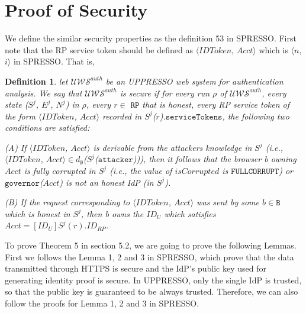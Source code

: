 \documentclass[letterpaper,onecolumn,10pt]{article}
\newtheorem{definition}{Definition}
\begin{document}
\section{Proof of Security}

We define  the similar security properties as the definition 53 in SPRESSO. 
First note that the RP service token should be defined as $\langle IDToken$, $Acct \rangle$ which is $\langle n$, $i \rangle$ in SPRESSO.
That is,  
\begin{definition}
let  $\mathcal{U\!W\!S}^{auth}$ be an UPPRESSO web system for authentication analysis. We say that $\mathcal{U\!W\!S}^{auth}$ is secure if for every run $\rho$ of $\mathcal{U\!W\!S}^{auth}$, every state ($S^j$, $E^j$, $N^j$) in $\rho$, every $r \in$ $\mathtt{RP}$ that is honest, every RP service token of the form $\langle IDToken$, $Acct \rangle$ recorded in $S^j$($r$).$\mathtt{serviceTokens}$, the following two conditions are satisfied:

(A) If $\langle IDToken$, $Acct \rangle$ is derivable from the attackers knowledge in $S^j$ (i.e., $\langle IDToken$, $Acct \rangle \in d_{\emptyset}$($S^j$($\mathtt{attacker}$))), then it follows that the browser b owning $Acct$ is fully corrupted in $S^j$ (i.e., the value of $isCorrupted$ is $\mathtt{FULLCORRUPT}$) or $\mathtt{governor}$($Acct$) is not an honest IdP (in $S^j$).

(B) If the request corresponding to $\langle IDToken$, $Acct \rangle$ was sent by some $b \in \mathtt{B}$ which is honest in $S^j$, then b owns the $ID_U$ which satisfies $Acct=[ID_U]S^j(r).ID_{RP}$.
\end{definition}

To prove Theorem 5 in section 5.2, we are going to prove the following Lemmas.
First we follows the Lemma 1, 2 and 3 in SPRESSO, which prove that the data transmitted through HTTPS is secure and the IdP's public key used for generating identity proof is secure. 
In UPPRESSO, only the single IdP is trusted, so that the public key is guaranteed to be always trusted.
Therefore, we can also follow the proofs for Lemma 1, 2 and 3 in SPRESSO.
\end{document}
